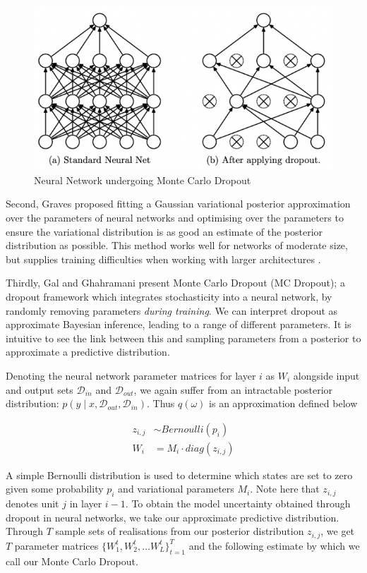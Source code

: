 \documentclass[ %
                    author={James Stephenson},
                supervisor={Dr. Edwin Simpson},
                    degree={MSc},
                     title={PROJECT PLAN},
                  subtitle={Bayesian Deep Learning For Extractive Test Summarisation},
                      type={},
                      year={2022}]{../additions/dissertation}
\begin{document}
			\begin{figure}[h]
				\centering
				\includegraphics[width=0.5\linewidth]{../additions/figures/Srivastava14_MCDropout}
				\caption{Neural Network undergoing Monte Carlo Dropout \cite{Srivastava14}}
				\label{fig:MC_dropout}
			\end{figure}
			
			Second, Graves \cite{Graves11} proposed fitting a Gaussian variational posterior approximation over the parameters of neural networks and optimising over the parameters to ensure the variational distribution is as good an estimate of the posterior distribution as possible. This method works well for networks of moderate size, but supplies training difficulties when working with larger architectures \cite{He15}.
			
			\medbreak
			Thirdly, Gal and Ghahramani \cite{Gal15} present Monte Carlo Dropout (MC Dropout); a dropout framework which integrates stochasticity into a neural network, by randomly removing parameters \emph{during training}. We can interpret dropout as approximate Bayesian inference, leading to a range of different parameters. It is intuitive to see the link between this and sampling parameters from a posterior to approximate a predictive distribution.
			
			\medbreak
			Denoting the neural network parameter matrices for layer $i$ as $W_i$ alongside input and output sets $\mathcal{D}_{in}$ and $\mathcal{D}_{out}$, we again suffer from an intractable posterior distribution: $p(y \mid x, \mathcal{D}_{out}, \mathcal{D}_{in})$. Thus $q(\omega)$ is an approximation defined below
			
			\begin{align*}
				z_{i, j} &\sim Bernoulli(p_i) \\
				W_i &= M_i \cdot diag(z_{i,j})
			\end{align*}
			
			\noindent
			A simple Bernoulli distribution is used to determine which states are set to zero given some probability $p_i$ and variational parameters $M_i$. Note here that $z_{i,j}$ denotes unit $j$ in layer $i-1$. To obtain the model uncertainty obtained through dropout in neural networks, we take our approximate predictive distribution. Through $T$ sample sets of realisations from our posterior distribution $z_{i,j}$, we get $T$ parameter matrices $\{W^{t}_{1}, W^{t}_{2}, \ldots W^{t}_{L}\}^{T}_{t=1}$ and the following estimate by which we call our Monte Carlo Dropout.
			
\end{document}
